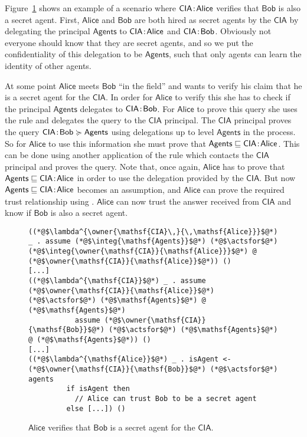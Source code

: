 Figure~\ref{fig:govt-alice-checks-bob} shows an example of a scenario where $\mathsf{CIA}\!:\!\mathsf{Alice}$ verifies that $\mathsf{Bob}$ is also a secret agent. First, $\mathsf{Alice}$ and $\mathsf{Bob}$ are both hired as secret agents by the $\mathsf{CIA}$ by delegating the principal $\mathsf{Agents}$ to $\mathsf{CIA}\!:\!\mathsf{Alice}$ and $\mathsf{CIA}\!:\!\mathsf{Bob}$. Obviously not everyone should know that they are secret agents, and so we put the confidentiality of this delegation to be $\mathsf{Agents}$, such that only agents can learn the identity of other agents.

At some point $\mathsf{Alice}$ meets $\mathsf{Bob}$ ``in the field'' and wants to verify his claim that he is a secret agent for the $\mathsf{CIA}$. In order for $\mathsf{Alice}$ to verify this she has to check if the principal $\mathsf{Agents}$ delegates to $\mathsf{CIA}\!:\!\mathsf{Bob}$. For $\mathsf{Alice}$ to prove this query she uses the  rule and delegates the query to the $\mathsf{CIA}$ principal. The $\mathsf{CIA}$ principal proves the query $\mathsf{CIA}\!:\!\mathsf{Bob} \succcurlyeq \mathsf{Agents}$ using delegations up to level $\mathsf{Agents}$ in the process. So for $\mathsf{Alice}$ to use this information she must prove that $\mathsf{Agents} \sqsubseteq \mathsf{CIA}\!:\!\mathsf{Alice}$. This can be done using another application of the  rule which contacts the $\mathsf{CIA}$ principal and proves the query. Note that, once again, $\mathsf{Alice}$ has to prove that $\mathsf{Agents} \sqsubseteq \mathsf{CIA}\!:\!\mathsf{Alice}$ in order to use the delegation provided by the $\mathsf{CIA}$. But now $\mathsf{Agents} \sqsubseteq \mathsf{CIA}\!:\!\mathsf{Alice}$ becomes an assumption, and $\mathsf{Alice}$ can prove the required trust relationship using .
$\mathsf{Alice}$ can now trust the answer received from $\mathsf{CIA}$ and know if $\mathsf{Bob}$ is also a secret agent.

\begin{figure}
\centering
\begin{lstlisting}
((*@$\lambda^{\owner{\mathsf{CIA}\,}{\,\mathsf{Alice}}}$@*) _ . assume (*@$\integ{\mathsf{Agents}}$@*) (*@$\actsfor$@*) (*@$\integ{\owner{\mathsf{CIA}}{\mathsf{Alice}}}$@*) @ (*@$\owner{\mathsf{CIA}}{\mathsf{Alice}}$@*)) ()
[...]
((*@$\lambda^{\mathsf{CIA}}$@*) _ . assume (*@$\owner{\mathsf{CIA}}{\mathsf{Alice}}$@*) (*@$\actsfor$@*) (*@$\mathsf{Agents}$@*) @ (*@$\mathsf{Agents}$@*)
           assume (*@$\owner{\mathsf{CIA}}{\mathsf{Bob}}$@*) (*@$\actsfor$@*) (*@$\mathsf{Agents}$@*) @ (*@$\mathsf{Agents}$@*)) ()
[...]
((*@$\lambda^{\mathsf{Alice}}$@*) _ . isAgent <- (*@$\owner{\mathsf{CIA}}{\mathsf{Bob}}$@*) (*@$\actsfor$@*) agents
         if isAgent then
           // Alice can trust Bob to be a secret agent
         else [...]) ()
\end{lstlisting}
\caption{$\mathsf{Alice}$ verifies that $\mathsf{Bob}$ is a secret agent for the $\mathsf{CIA}$.}
\label{fig:govt-alice-checks-bob}
\end{figure}